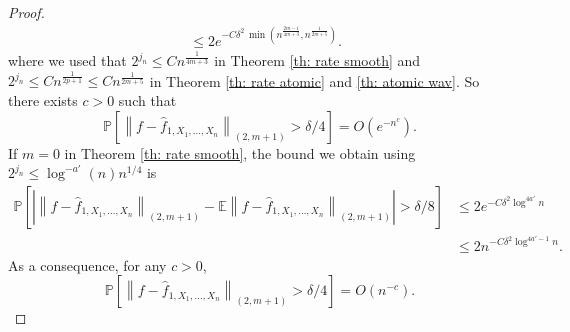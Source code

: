 \documentclass[preprint]{imsart}
\newcommand\norm[1]{\left\lVert#1\right\rVert}
\numberwithin{equation}{section}
\begin{document}
\begin{appendix}
\begin{proof}
\begin{align*}
&\leq 2e^{-C\delta^2\,\min(n^{\frac{2m-1}{4m+3}},n^{\frac{1}{2m+5}})}.
\end{align*}
where we used that $2^{j_n}\leq Cn^{\frac{1}{4m+3}}$ in Theorem \ref{th: rate smooth} and $2^{j_n}\leq Cn^{\frac{1}{2p+1}}\leq Cn^{\frac{1}{2m+5}}$ in Theorem \ref{th: rate atomic} and \ref{th: atomic wav}. So there exists $c>0$ such that
\begin{equation}\label{eq: exp decay prob large empir dist}
    \mathbb{P}\left[\norm{f-\hat{f}_{1,X_1,\dots,X_n}}_{(2,m+1)}> \delta/4\right]=O(e^{-n^c}).
\end{equation}
If $m=0$ in Theorem \ref{th: rate smooth}, the bound we obtain using $2^{j_n}\leq \log^{-a'}(n)n^{1/4}$ is
\begin{align*}
\mathbb{P}\left[\left|\norm{f-\hat{f}_{1,X_1,\dots,X_n}}_{(2,m+1)}-\mathbb{E}\norm{f-\hat{f}_{1,X_1,\dots,X_n}}_{(2,m+1)}\right|> \delta/8\right] &\leq 2e^{-C\delta^2\log^{4a'}n}\\
&\leq 2n^{-C\delta^2\log^{4a'-1}n}.
\end{align*}
As a consequence, for any $c>0$,
\begin{equation}\label{eq: more than polynom decay prob large empir dist}
    \mathbb{P}\left[\norm{f-\hat{f}_{1,X_1,\dots,X_n}}_{(2,m+1)}> \delta/4\right]=O(n^{-c}).
\end{equation}


\end{proof}
\end{appendix}
\end{document}
